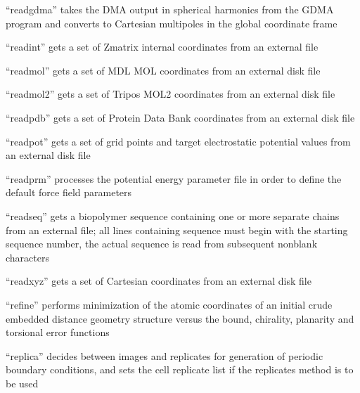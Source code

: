 \documentclass[letterpaper,11pt,english]{sphinxmanual}
\begin{document}
“readgdma” takes the DMA output in spherical harmonics from
the GDMA program and converts to Cartesian multipoles in
the global coordinate frame


“readint” gets a set of Z\sphinxhyphen{}matrix internal coordinates
from an external file


“readmol” gets a set of MDL MOL coordinates from
an external disk file


“readmol2” gets a set of Tripos MOL2 coordinates from an
external disk file


“readpdb” gets a set of Protein Data Bank coordinates
from an external disk file


“readpot” gets a set of grid points and target electrostatic
potential values from an external disk file


“readprm” processes the potential energy parameter file
in order to define the default force field parameters


“readseq” gets a biopolymer sequence containing one or more
separate chains from an external file; all lines containing
sequence must begin with the starting sequence number, the
actual sequence is read from subsequent nonblank characters


“readxyz” gets a set of Cartesian coordinates from
an external disk file


“refine” performs minimization of the atomic coordinates
of an initial crude embedded distance geometry structure versus
the bound, chirality, planarity and torsional error functions



“replica” decides between images and replicates for generation
of periodic boundary conditions, and sets the cell replicate
list if the replicates method is to be used
\end{document}
